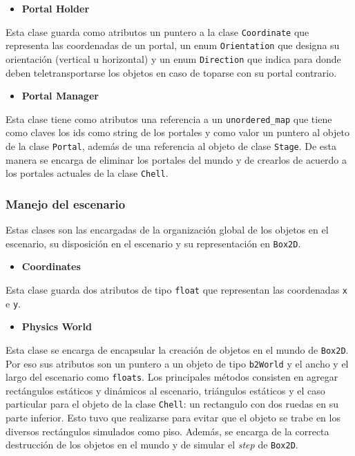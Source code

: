 \documentclass[a4paper]{article}
\begin{document}
\begin{itemize}
	\item \textbf{Portal Holder}
\end{itemize}

Esta clase guarda como atributos un puntero a la clase \texttt{Coordinate} que representa las coordenadas de un portal, un enum \texttt{Orientation} que designa su orientación (vertical u horizontal) y un enum \texttt{Direction} que indica para donde deben teletransportarse los objetos en caso de toparse con su portal contrario.

\begin{itemize}
	\item \textbf{Portal Manager}
\end{itemize}

Esta clase tiene como atributos una referencia a un \texttt{unordered\_map} que tiene como claves los ids como string de los portales y como valor un puntero al objeto de la clase \texttt{Portal}, además de una referencia al objeto de clase \texttt{Stage}. De esta manera se encarga de eliminar los portales del mundo y de crearlos de acuerdo a los portales actuales de la clase \texttt{Chell}.

\subsubsection{Manejo del escenario}

Estas clases son las encargadas de la organización global de los objetos en el escenario, su disposición en el escenario y su representación en \texttt{Box2D}.

\begin{itemize}
	\item \textbf{Coordinates}
\end{itemize}
Esta clase guarda dos atributos de tipo \texttt{float} que representan las coordenadas \texttt{x} e \texttt{y}.

\begin{itemize}
	\item \textbf{Physics World}
\end{itemize}
Esta clase se encarga de encapsular la creación de objetos en el mundo de \texttt{Box2D}. Por eso sus atributos son un puntero a un objeto de tipo \texttt{b2World} y el ancho y el largo del escenario como \texttt{floats}. Los principales métodos consisten en agregar rectángulos estáticos y dinámicos al escenario, triángulos estáticos y el caso particular para el objeto de la clase \texttt{Chell}: un rectangulo con dos ruedas en su parte inferior. Esto tuvo que realizarse para evitar que el objeto se trabe en los diversos rectángulos simulados como piso. Además, se encarga de la correcta destrucción de los objetos en el mundo y de simular el \textit{step} de \texttt{Box2D}.
\end{document}
